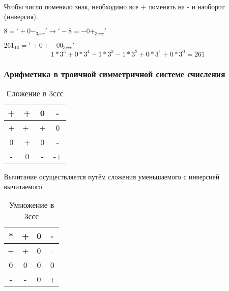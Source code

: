 Чтобы число поменяло знак, необходимо все + поменять на - и наоборот (инверсия).
\begin{eg}
  $8 = '+0-_{3ccc}' \to '-8 = -0+_{3ccc}'$
\end{eg}
\begin{eg}
  $261_{10} = '+0+-00_{3ccc}'$ \[
    1 * 3^5 + 0 * 3^4 + 1 * 3^3 - 1 * 3^2 + 0 * 3^1 + 0 * 3^0 = 261
  \]
\end{eg}

\subsubsection{Арифметика в троичной симметричной системе счисления}

\begin{table}[htpb]
  \centering
  \caption{Сложение в 3ссс}
  \label{tab:label}
  \begin{tabular}{ c | c c c }
    + &  + & 0 &  - \\
    \hline
    + & +- & + &  0 \\
    0 &  + & 0 &  - \\
    - &  0 & - & -+ \\
  \end{tabular}
\end{table}

Вычитание осуществляется путём сложения уменьшаемого с инверсией вычитаемого.

\begin{table}[htpb]
  \centering
  \caption{Умножение в 3ссс}
  \label{tab:label}
  \begin{tabular}{ c | c c c }
    * &  + &  0 &  - \\
    \hline
    + &  + &  0 &  - \\
    0 &  0 &  0 &  0 \\
    - &  - &  0 &  + \\
  \end{tabular}
\end{table}

